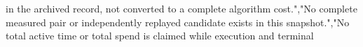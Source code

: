 \documentclass[10pt]{article}
\begin{document}
\allowbreak{}i\allowbreak{}n\allowbreak{} \allowbreak{}t\allowbreak{}h\allowbreak{}e\allowbreak{} \allowbreak{}a\allowbreak{}r\allowbreak{}c\allowbreak{}h\allowbreak{}i\allowbreak{}v\allowbreak{}e\allowbreak{}d\allowbreak{} \allowbreak{}r\allowbreak{}e\allowbreak{}c\allowbreak{}o\allowbreak{}r\allowbreak{}d\allowbreak{},\allowbreak{} \allowbreak{}n\allowbreak{}o\allowbreak{}t\allowbreak{} \allowbreak{}c\allowbreak{}o\allowbreak{}n\allowbreak{}v\allowbreak{}e\allowbreak{}r\allowbreak{}t\allowbreak{}e\allowbreak{}d\allowbreak{} \allowbreak{}t\allowbreak{}o\allowbreak{} \allowbreak{}a\allowbreak{} \allowbreak{}c\allowbreak{}o\allowbreak{}m\allowbreak{}p\allowbreak{}l\allowbreak{}e\allowbreak{}t\allowbreak{}e\allowbreak{} \allowbreak{}a\allowbreak{}l\allowbreak{}g\allowbreak{}o\allowbreak{}r\allowbreak{}i\allowbreak{}t\allowbreak{}h\allowbreak{}m\allowbreak{} \allowbreak{}c\allowbreak{}o\allowbreak{}s\allowbreak{}t\allowbreak{}.\allowbreak{}"\allowbreak{},\allowbreak{}"\allowbreak{}N\allowbreak{}o\allowbreak{} \allowbreak{}c\allowbreak{}o\allowbreak{}m\allowbreak{}p\allowbreak{}l\allowbreak{}e\allowbreak{}t\allowbreak{}e\allowbreak{} \allowbreak{}m\allowbreak{}e\allowbreak{}a\allowbreak{}s\allowbreak{}u\allowbreak{}r\allowbreak{}e\allowbreak{}d\allowbreak{} \allowbreak{}p\allowbreak{}a\allowbreak{}i\allowbreak{}r\allowbreak{} \allowbreak{}o\allowbreak{}r\allowbreak{} \allowbreak{}i\allowbreak{}n\allowbreak{}d\allowbreak{}e\allowbreak{}p\allowbreak{}e\allowbreak{}n\allowbreak{}d\allowbreak{}e\allowbreak{}n\allowbreak{}t\allowbreak{}l\allowbreak{}y\allowbreak{} \allowbreak{}r\allowbreak{}e\allowbreak{}p\allowbreak{}l\allowbreak{}a\allowbreak{}y\allowbreak{}e\allowbreak{}d\allowbreak{} \allowbreak{}c\allowbreak{}a\allowbreak{}n\allowbreak{}d\allowbreak{}i\allowbreak{}d\allowbreak{}a\allowbreak{}t\allowbreak{}e\allowbreak{} \allowbreak{}e\allowbreak{}x\allowbreak{}i\allowbreak{}s\allowbreak{}t\allowbreak{}s\allowbreak{} \allowbreak{}i\allowbreak{}n\allowbreak{} \allowbreak{}t\allowbreak{}h\allowbreak{}i\allowbreak{}s\allowbreak{} \allowbreak{}s\allowbreak{}n\allowbreak{}a\allowbreak{}p\allowbreak{}s\allowbreak{}h\allowbreak{}o\allowbreak{}t\allowbreak{}.\allowbreak{}"\allowbreak{},\allowbreak{}"\allowbreak{}N\allowbreak{}o\allowbreak{} \allowbreak{}t\allowbreak{}o\allowbreak{}t\allowbreak{}a\allowbreak{}l\allowbreak{} \allowbreak{}a\allowbreak{}c\allowbreak{}t\allowbreak{}i\allowbreak{}v\allowbreak{}e\allowbreak{} \allowbreak{}t\allowbreak{}i\allowbreak{}m\allowbreak{}e\allowbreak{} \allowbreak{}o\allowbreak{}r\allowbreak{} \allowbreak{}t\allowbreak{}o\allowbreak{}t\allowbreak{}a\allowbreak{}l\allowbreak{} \allowbreak{}s\allowbreak{}p\allowbreak{}e\allowbreak{}n\allowbreak{}d\allowbreak{} \allowbreak{}i\allowbreak{}s\allowbreak{} \allowbreak{}c\allowbreak{}l\allowbreak{}a\allowbreak{}i\allowbreak{}m\allowbreak{}e\allowbreak{}d\allowbreak{} \allowbreak{}w\allowbreak{}h\allowbreak{}i\allowbreak{}l\allowbreak{}e\allowbreak{} \allowbreak{}e\allowbreak{}x\allowbreak{}e\allowbreak{}c\allowbreak{}u\allowbreak{}t\allowbreak{}i\allowbreak{}o\allowbreak{}n\allowbreak{} \allowbreak{}a\allowbreak{}n\allowbreak{}d\allowbreak{} \allowbreak{}t\allowbreak{}e\allowbreak{}r\allowbreak{}m\allowbreak{}i\allowbreak{}n\allowbreak{}a\allowbreak{}l\allowbreak{} 
\end{document}
